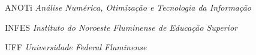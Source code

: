 \begin{siglas}

\item[{ANOTi}] \emph{Análise Numérica, Otimização e Tecnologia da Informação}
\item[{INFES}] \emph{Instituto do Noroeste Fluminense de Educação Superior}
\item[{UFF}] \emph{Universidade Federal Fluminense}

\end{siglas}